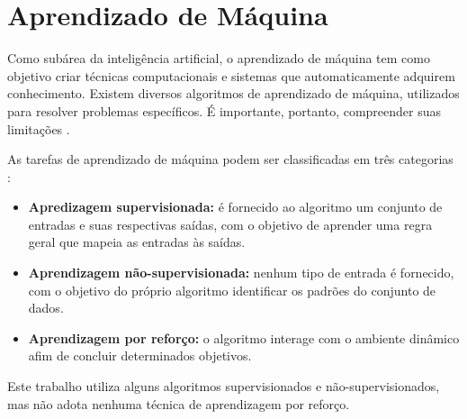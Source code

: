 \clearpage
\section{Aprendizado de Máquina}

Como subárea da inteligência artificial, o aprendizado de máquina tem como objetivo criar técnicas computacionais e sistemas que automaticamente adquirem conhecimento. Existem diversos algoritmos de aprendizado de máquina, utilizados para resolver problemas específicos. É importante, portanto, compreender suas limitações \cite{rezende2003}.

As tarefas de aprendizado de máquina podem ser classificadas em três categorias \cite{russel2003}:

\begin{itemize}
    \item \textbf{Apredizagem supervisionada:} é fornecido ao algoritmo um conjunto de entradas e suas respectivas saídas, com o objetivo de aprender uma regra geral que mapeia as entradas às saídas.
    \item \textbf{Aprendizagem não-supervisionada:} nenhum tipo de entrada é fornecido, com o objetivo do próprio algoritmo identificar os padrões do conjunto de dados.
    \item \textbf{Aprendizagem por reforço:} o algoritmo interage com o ambiente dinâmico afim de concluir determinados objetivos.
\end{itemize}

Este trabalho utiliza alguns algoritmos supervisionados e não-supervisionados, mas não adota nenhuma técnica de aprendizagem por reforço.




